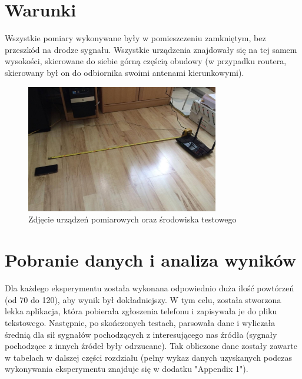 \section{Warunki}
Wszystkie pomiary wykonywane były w pomieszczeniu zamkniętym, bez przeszkód na drodze sygnału. Wszystkie urządzenia znajdowały się na tej samem wysokości, skierowane do siebie górną częścią obudowy (w przypadku routera, skierowany był on do odbiornika swoimi antenami kierunkowymi).
\begin{figure}[H]
	\centering			
	\caption{Zdjęcie urządzeń pomiarowych oraz środowiska testowego}
	\includegraphics[width=0.75\textwidth]{srodowisko_pomiarowe}
\end{figure}
\section{Pobranie danych i analiza wyników}
Dla każdego eksperymentu została wykonana odpowiednio duża ilość powtórzeń (od 70 do 120), aby wynik był dokładniejszy. W tym celu, została stworzona lekka aplikacja, która pobierała zgłoszenia telefonu i zapisywała je do pliku tekstowego. Następnie, po skończonych testach, parsowała dane i wyliczała średnią dla sił sygnałów pochodzących z interesującego nas źródła (sygnały pochodzące z innych źródeł były odrzucane). Tak obliczone dane zostały zawarte w tabelach w dalszej części rozdziału (pełny wykaz danych uzyskanych podczas wykonywania eksperymentu znajduje się w dodatku "Appendix 1").
